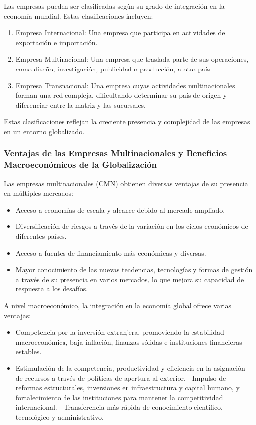 \documentclass[
  jou,
  floatsintext,
  longtable,
  a4paper,
  nolmodern,
  notxfonts,
  notimes,
  12pt,
  colorlinks=true,linkcolor=blue,citecolor=blue,urlcolor=blue]{apa7}
\providecommand{\tightlist}{%
  \setlength{\itemsep}{0pt}\setlength{\parskip}{0pt}}
\begin{document}
Las empresas pueden ser clasificadas según su grado de integración en la
economía mundial. Estas clasificaciones incluyen:

\begin{enumerate}
\def\labelenumi{\arabic{enumi}.}
\tightlist
\item
  Empresa Internacional: Una empresa que participa en actividades de
  exportación e importación.
\item
  Empresa Multinacional: Una empresa que traslada parte de sus
  operaciones, como diseño, investigación, publicidad o producción, a
  otro país.
\item
  Empresa Transnacional: Una empresa cuyas actividades multinacionales
  forman una red compleja, dificultando determinar su país de origen y
  diferenciar entre la matriz y las sucursales.
\end{enumerate}

Estas clasificaciones reflejan la creciente presencia y complejidad de
las empresas en un entorno globalizado.

\subsubsection{Ventajas de las Empresas Multinacionales y Beneficios
Macroeconómicos de la
Globalización}\label{ventajas-de-las-empresas-multinacionales-y-beneficios-macroeconuxf3micos-de-la-globalizaciuxf3n}

Las empresas multinacionales (CMN) obtienen diversas ventajas de su
presencia en múltiples mercados:

\begin{itemize}
\tightlist
\item
  Acceso a economías de escala y alcance debido al mercado ampliado.
\item
  Diversificación de riesgos a través de la variación en los ciclos
  económicos de diferentes países.
\item
  Acceso a fuentes de financiamiento más económicas y diversas.
\item
  Mayor conocimiento de las nuevas tendencias, tecnologías y formas de
  gestión a través de su presencia en varios mercados, lo que mejora su
  capacidad de respuesta a los desafíos.
\end{itemize}

A nivel macroeconómico, la integración en la economía global ofrece
varias ventajas:

\begin{itemize}
\tightlist
\item
  Competencia por la inversión extranjera, promoviendo la estabilidad
  macroeconómica, baja inflación, finanzas sólidas e instituciones
  financieras estables.
\item
  Estimulación de la competencia, productividad y eficiencia en la
  asignación de recursos a través de políticas de apertura al exterior.
  - Impulso de reformas estructurales, inversiones en infraestructura y
  capital humano, y fortalecimiento de las instituciones para mantener
  la competitividad internacional. - Transferencia más rápida de
  conocimiento científico, tecnológico y administrativo.
\end{itemize}
\end{document}
